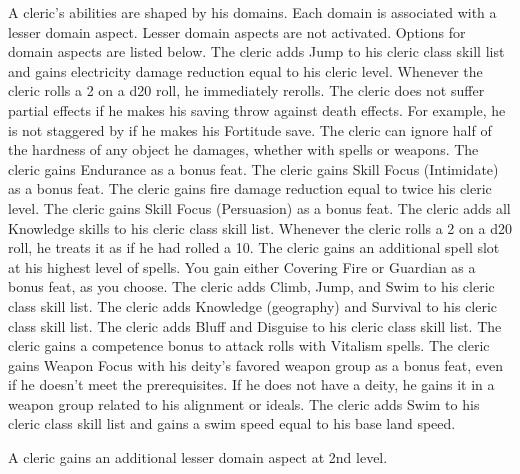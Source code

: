  A cleric's abilities are shaped by his domains. Each domain is associated with a lesser domain aspect. Lesser domain aspects are not activated. Options for domain aspects are listed below.
 The cleric adds Jump to his cleric class skill list and gains electricity damage reduction equal to his cleric level.
 Whenever the cleric rolls a 2 on a d20 roll, he immediately rerolls.
 The cleric does not suffer partial effects if he makes his saving throw against death effects. For example, he is not staggered by  if he makes his Fortitude save.
 The cleric can ignore half of the hardness of any object he damages, whether with spells or weapons.
 The cleric gains Endurance as a bonus feat.
 The cleric gains Skill Focus (Intimidate) as a bonus feat.
 The cleric gains fire damage reduction equal to twice his cleric level.
 The cleric gains Skill Focus (Persuasion) as a bonus feat.
 The cleric adds all Knowledge skills to his cleric class skill list.
 Whenever the cleric rolls a 2 on a d20 roll, he treats it as if he had rolled a 10.
 The cleric gains an additional spell slot at his highest level of spells.
 You gain either Covering Fire or Guardian as a bonus feat, as you choose.
 The cleric adds Climb, Jump, and Swim to his cleric class skill list.
 The cleric adds Knowledge (geography) and Survival to his cleric class skill list.
 The cleric adds Bluff and Disguise to his cleric class skill list.
 The cleric gains a  competence bonus to attack rolls with Vitalism spells.
 The cleric gains Weapon Focus with his deity's favored weapon group as a bonus feat, even if he doesn't meet the prerequisites. If he does not have a deity, he gains it in a weapon group related to his alignment or ideals.
 The cleric adds Swim to his cleric class skill list and gains a swim speed equal to his base land speed.

A cleric gains an additional lesser domain aspect at 2nd level.

